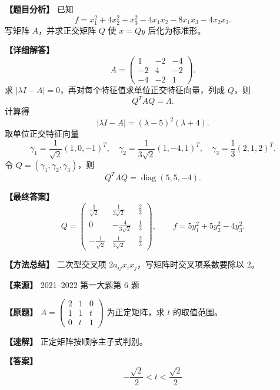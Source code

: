 \documentclass[11pt,a4paper,UTF8]{ctexart}
\newcommand{\diag}{\operatorname{diag}}
\begin{document}
\begin{answerbox}
\textbf{【题目分析】} 已知
\[
f=x_1^2+4x_2^2+x_3^2-4x_1x_2-8x_1x_3-4x_2x_3.
\]
写矩阵 $A$，并求正交矩阵 $Q$ 使 $x=Qy$ 后化为标准形。

\textbf{【详细解答】}
\[
A=\begin{pmatrix}
1&-2&-4\\
-2&4&-2\\
-4&-2&1
\end{pmatrix}.
\]
求 $|\lambda I-A|=0$，再对每个特征值求单位正交特征向量，列成 $Q$，则
\[
Q^TAQ=\Lambda.
\]
计算得
\[
|\lambda I-A|=(\lambda-5)^2(\lambda+4).
\]
取单位正交特征向量
\[
\gamma_1=\frac1{\sqrt2}(1,0,-1)^T,\quad
\gamma_2=\frac1{3\sqrt2}(1,-4,1)^T,\quad
\gamma_3=\frac13(2,1,2)^T.
\]
令 $Q=(\gamma_1,\gamma_2,\gamma_3)$，则
\[
Q^TAQ=\diag(5,5,-4).
\]

\textbf{【最终答案】}
\[
Q=\begin{pmatrix}
\frac1{\sqrt2}&\frac1{3\sqrt2}&\frac23\\
0&-\frac4{3\sqrt2}&\frac13\\
-\frac1{\sqrt2}&\frac1{3\sqrt2}&\frac23
\end{pmatrix},
\qquad
f=5y_1^2+5y_2^2-4y_3^2.
\]

\textbf{【方法总结】} 二次型交叉项 $2a_{ij}x_ix_j$，写矩阵时交叉项系数要除以 $2$。
\end{answerbox}

\begin{answerbox}
\textbf{【来源】} 2021--2022 第一大题第 6 题

\textbf{【原题】}
$A=\begin{pmatrix}2&1&0\\1&1&t\\0&t&1\end{pmatrix}$ 为正定矩阵，求 $t$ 的取值范围。

\textbf{【速解】}
正定矩阵按顺序主子式判别。

\textbf{【答案】}
\[-\frac{\sqrt2}{2}<t<\frac{\sqrt2}{2}\]
\end{answerbox}
\end{document}
